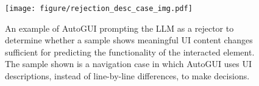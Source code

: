 \begin{figure}[th]
    \centering
    \texttt{[image: figure/rejection\_desc\_case\_img.pdf]}
    \caption{An example of AutoGUI prompting the LLM as a rejector to determine whether a sample shows meaningful UI content changes sufficient for predicting the functionality of the interacted element. The sample shown is a navigation case in which AutoGUI uses UI descriptions, instead of line-by-line differences, to make decisions.}
    \label{fig: rejection desc case}
\end{figure}
